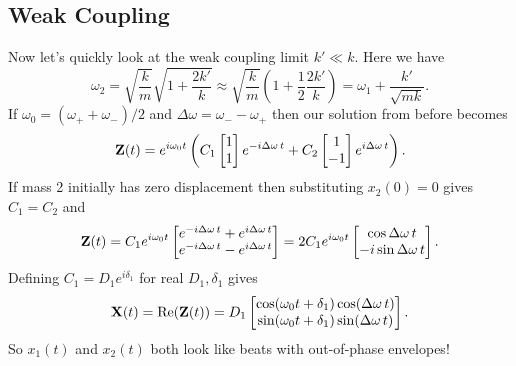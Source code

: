 \documentclass[../p111main.tex]{subfiles}
\begin{document}
\subsection*{Weak Coupling}
Now let's quickly look at the weak coupling limit $k' \ll k$.
Here we have
\[ \omega_2 = \sqrt{\frac{k}{m}} \sqrt{1 + \frac{2k'}{k}} \approx \sqrt{\frac{k}{m}} \left( 1 + \frac{1}{2} \frac{2k'}{k} \right) = \omega_1 + \frac{k'}{\sqrt{mk}}. \]
If $\omega_0 = (\omega_+ + \omega_-) / 2$ and $\Delta \omega = \omega_- - \omega_+$ then our solution from before becomes
\[ \mathbf{Z}(t) = e^{i\omega_0 t} \left( C_1 \begin{bmatrix} 1 \\ 1 \end{bmatrix} e^{-i \Delta \omega \,t} + C_2 \begin{bmatrix} 1 \\ -1 \end{bmatrix} e^{i \Delta \omega \,t} \right). \]
If mass 2 initially has zero displacement then substituting $x_2(0) = 0$ gives $C_1 = C_2$ and
\[ \mathbf{Z}(t) = C_1 e^{i \omega_0 t} \begin{bmatrix} e^{-i \Delta \omega \,t} + e^{i \Delta \omega \,t} \\ e^{-i \Delta \omega \,t} - e^{i \Delta \omega \,t} \end{bmatrix} = 2 C_1 e^{i\omega_0 t} \begin{bmatrix} \cos \Delta \omega \,t \\ -i \sin \Delta \omega \,t \end{bmatrix}. \]
Defining $C_1 = D_1 e^{i \delta_1}$ for real $D_1, \delta_1$ gives
\[ \mathbf{X}(t) = \operatorname{Re} (\mathbf{Z}(t)) = D_1 \begin{bmatrix} \cos(\omega_0 t + \delta_1) \cos (\Delta \omega \,t) \\ \sin(\omega_0 t + \delta_1) \sin (\Delta \omega \,t) \end{bmatrix}. \]
So $x_1(t)$ and $x_2(t)$ both look like beats with out-of-phase envelopes!
\end{document}
